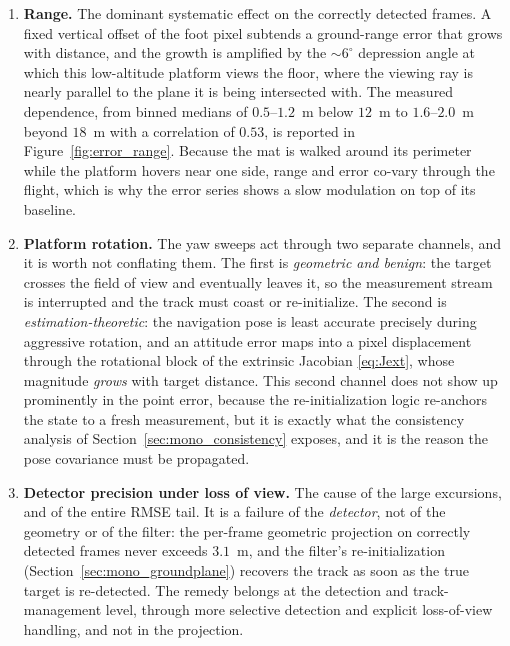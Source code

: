 \begin{enumerate}
  \item \textbf{Range.} The dominant systematic effect on the correctly detected
  frames. A fixed vertical offset of the foot pixel subtends a ground-range error
  that grows with distance, and the growth is amplified by the $\sim 6^\circ$
  depression angle at which this low-altitude platform views the floor, where the
  viewing ray is nearly parallel to the plane it is being intersected with. The
  measured dependence, from binned medians of $0.5$--$1.2$~m below $12$~m to
  $1.6$--$2.0$~m beyond $18$~m with a correlation of $0.53$, is reported in
  Figure~\ref{fig:error_range}. Because the mat is walked around its perimeter
  while the platform hovers near one side, range and error co-vary through the
  flight, which is why the error series shows a slow modulation on top of its
  baseline.
  \item \textbf{Platform rotation.} The yaw sweeps act through two separate
  channels, and it is worth not conflating them. The first is \emph{geometric and
  benign}: the target crosses the field of view and eventually leaves it, so the
  measurement stream is interrupted and the track must coast or re-initialize.
  The second is \emph{estimation-theoretic}: the navigation pose is least accurate
  precisely during aggressive rotation, and an attitude error maps into a pixel
  displacement through the rotational block of the extrinsic Jacobian
  \eqref{eq:Jext}, whose magnitude \emph{grows} with target distance. This second
  channel does not show up prominently in the point error, because the
  re-initialization logic re-anchors the state to a fresh measurement, but it is
  exactly what the consistency analysis of
  Section~\ref{sec:mono_consistency} exposes, and it is the reason the pose
  covariance must be propagated.
  \item \textbf{Detector precision under loss of view.} The cause of the large
  excursions, and of the entire RMSE tail. It is a failure of the
  \emph{detector}, not of the geometry or of the filter: the per-frame geometric
  projection on correctly detected frames never exceeds $3.1$~m, and the filter's
  re-initialization (Section~\ref{sec:mono_groundplane}) recovers the track as
  soon as the true target is re-detected. The remedy belongs at the detection and
  track-management level, through more selective detection and explicit
  loss-of-view handling, and not in the projection.
\end{enumerate}


